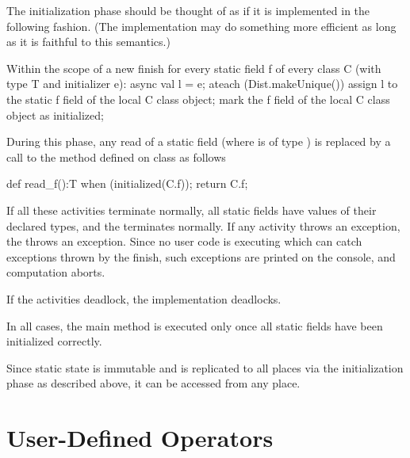 The initialization phase should be thought of as if it is implemented in
the following fashion. (The implementation may do something more
efficient as long as it is faithful to this semantics.)

\begin{xten}
Within the scope of a new finish
for every static field f of every class C 
   (with type T and initializer e):
async {
  val l = e; 
  ateach (Dist.makeUnique()) {
     assign l to the static f field of 
         the local C class object;
     mark the f field of the local C 
         class object as initialized;
  }
}
\end{xten}

During this phase, any read of a static field  (where  is of type )
is replaced by a call to the method  defined on class 
as follows

\begin{xten}
def read_f():T {
   when (initialized(C.f)){};
   return C.f;
}
\end{xten}
 

If all these activities terminate normally, all static fields have values of
their declared types, 
and the  terminates normally. If
any activity throws an exception, the  throws an
exception. Since no user code is executing which can catch exceptions
thrown by the finish, such exceptions are printed on the console, and
computation aborts.

If the activities deadlock, the implementation deadlocks.

In all cases, the main method is executed only once all static fields
have been initialized correctly.

Since static state is immutable and is replicated to all places via 
the initialization phase as described above, it can be accessed from
any place.



\section{User-Defined Operators}
\label{sect:operators}

